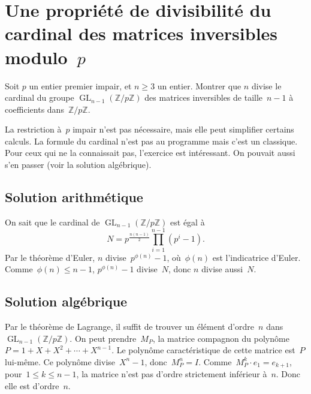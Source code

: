 \section{Une propriété de divisibilité du cardinal des matrices inversibles modulo~$p$}

Soit $p$ un entier premier impair, et $n\geq 3$ un entier. Montrer que $n$
divise le cardinal du groupe $\operatorname{GL}_{n-1}(\mathbb{Z}/p\mathbb{Z})$ des
matrices inversibles de taille~$n-1$ à coefficients
dans~$\mathbb{Z}/p\mathbb{Z}$.

\begin{em}
  La restriction à~$p$ impair n'est pas nécessaire, mais elle peut simplifier
  certains calculs.
  La formule du cardinal n'est pas au programme mais c'est un classique.
  Pour ceux qui ne la connaissait pas, l'exercice est intéressant.
  On pouvait aussi s'en passer (voir la solution algébrique).
\end{em}

\subsection*{Solution arithmétique}

On sait que le cardinal de $\operatorname{GL}_{n-1}(\mathbb{Z}/p \mathbb{Z})$ est égal à
\[ N = p^{\frac{n (n-1)}{2}} \prod_{i=1}^{n-1}  (p^i  -1). \]
Par le théorème d'Euler, $n$ divise~$p^{\phi(n)} - 1$, où~$\phi(n)$ est l'indicatrice d'Euler.
Comme~$\phi(n) \leq n-1$, $p^{\phi(n)} - 1$ divise~$N$, donc $n$ divise aussi~$N$.

\subsection*{Solution algébrique}

Par le théorème de Lagrange, il suffit de trouver un élément d'ordre~$n$ dans~$\operatorname{GL}_{n-1}(\mathbb{Z}/p\mathbb{Z})$.
On peut prendre~$M_P$, la matrice compagnon du polynôme~$P = 1+X+X^2+ \dotsb + X^{n-1}$.
Le polynôme caractéristique de cette matrice est~$P$ lui-même. Ce polynôme divise~$X^n-1$, donc~$M_P^n = I$.
Comme~$M_P^k \cdot e_1 = e_{k+1}$, pour~$1\leq k\leq n-1$, la matrice n'est pas d'ordre strictement inférieur à~$n$.
Donc elle est d'ordre~$n$.

